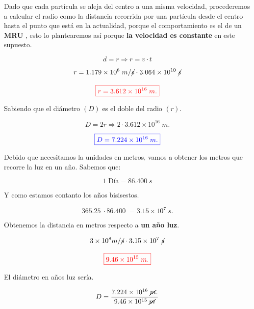 \documentclass[a4paper,12pt]{article} %
\begin{document}
\newpage

\begin{justify}
    Dado que cada partícula se aleja del centro a una misma velocidad, procederemos a calcular el radio como la distancia recorrida
    por una partícula desde el centro hasta el punto que está en la actualidad, porque el comportamiento es el de un \textbf{MRU} , esto lo plantearemos
    así porque \textbf{la velocidad es constante} en este supuesto.
\end{justify}

\[ d = r \Rightarrow r = v \cdot t \]

\[ r =  1.179 \times 10^6 \; m/\cancel{s} \cdot 3.064 \times 10^{10} \; \cancel{s}  \]

\[ \textcolor{red}{\boxed{ r = 3.612 \times 10^{16} \; m. }}\]

\begin{justify}
    Sabiendo que el diámetro \((D)\) es el doble del radio \((r)\).
\end{justify}


\[ D = 2r \Rightarrow 2 \cdot 3.612 \times 10^{16} \; m. \]

\[ \textcolor{blue}{ \boxed{D = 7.224 \times 10^{16} \; m.} }\]

\begin{justify}
    Debido que necesitamos la unidades en metros, vamos a obtener los metros que recorre la luz en un año.
    Sabemos que:
\end{justify}

\[ \text{1 Día} = 86.400 \; s \]

\begin{justify}
    Y como estamos contanto los años bisisestos.
\end{justify}

\[ 365.25 \ \cdot 86.400 \; = 3.15 \times 10 ^7 \; s. \]

\begin{justify}
    Obtenemos la distancia en metros respecto a \textbf{un año luz}.
\end{justify}

\[ 3 \times 10^8  m/\cancel{s} \cdot 3.15 \times 10^7 \; \cancel{s} \]

\[ \textcolor{red}{\boxed{ 9.46 \times 10^{15} \; m.}} \]

\begin{justify}
    El diámetro en años luz sería.
\end{justify}

\[ D = \frac{7.224 \times 10^{16} \; \cancel{m}.}{9.46 \times 10^{15} \; \cancel{m} } \]
\end{document}
